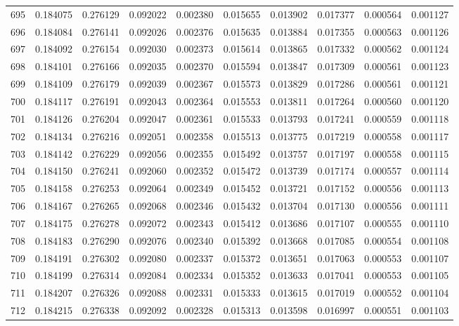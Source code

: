 \begin{tabular}{lrrrrrrrrr}
695 & 0.184075 & 0.276129 & 0.092022 & 0.002380 & 0.015655 & 0.013902 & 0.017377 & 0.000564 & 0.001127 \\
696 & 0.184084 & 0.276141 & 0.092026 & 0.002376 & 0.015635 & 0.013884 & 0.017355 & 0.000563 & 0.001126 \\
697 & 0.184092 & 0.276154 & 0.092030 & 0.002373 & 0.015614 & 0.013865 & 0.017332 & 0.000562 & 0.001124 \\
698 & 0.184101 & 0.276166 & 0.092035 & 0.002370 & 0.015594 & 0.013847 & 0.017309 & 0.000561 & 0.001123 \\
699 & 0.184109 & 0.276179 & 0.092039 & 0.002367 & 0.015573 & 0.013829 & 0.017286 & 0.000561 & 0.001121 \\
700 & 0.184117 & 0.276191 & 0.092043 & 0.002364 & 0.015553 & 0.013811 & 0.017264 & 0.000560 & 0.001120 \\
701 & 0.184126 & 0.276204 & 0.092047 & 0.002361 & 0.015533 & 0.013793 & 0.017241 & 0.000559 & 0.001118 \\
702 & 0.184134 & 0.276216 & 0.092051 & 0.002358 & 0.015513 & 0.013775 & 0.017219 & 0.000558 & 0.001117 \\
703 & 0.184142 & 0.276229 & 0.092056 & 0.002355 & 0.015492 & 0.013757 & 0.017197 & 0.000558 & 0.001115 \\
704 & 0.184150 & 0.276241 & 0.092060 & 0.002352 & 0.015472 & 0.013739 & 0.017174 & 0.000557 & 0.001114 \\
705 & 0.184158 & 0.276253 & 0.092064 & 0.002349 & 0.015452 & 0.013721 & 0.017152 & 0.000556 & 0.001113 \\
706 & 0.184167 & 0.276265 & 0.092068 & 0.002346 & 0.015432 & 0.013704 & 0.017130 & 0.000556 & 0.001111 \\
707 & 0.184175 & 0.276278 & 0.092072 & 0.002343 & 0.015412 & 0.013686 & 0.017107 & 0.000555 & 0.001110 \\
708 & 0.184183 & 0.276290 & 0.092076 & 0.002340 & 0.015392 & 0.013668 & 0.017085 & 0.000554 & 0.001108 \\
709 & 0.184191 & 0.276302 & 0.092080 & 0.002337 & 0.015372 & 0.013651 & 0.017063 & 0.000553 & 0.001107 \\
710 & 0.184199 & 0.276314 & 0.092084 & 0.002334 & 0.015352 & 0.013633 & 0.017041 & 0.000553 & 0.001105 \\
711 & 0.184207 & 0.276326 & 0.092088 & 0.002331 & 0.015333 & 0.013615 & 0.017019 & 0.000552 & 0.001104 \\
712 & 0.184215 & 0.276338 & 0.092092 & 0.002328 & 0.015313 & 0.013598 & 0.016997 & 0.000551 & 0.001103 \\

\end{tabular}
